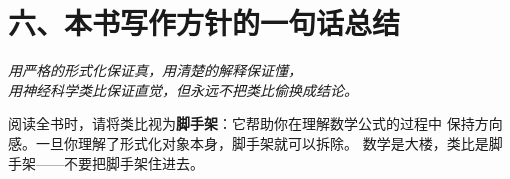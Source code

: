 \section*{六、本书写作方针的一句话总结}

\begin{center}
\large
\textit{用严格的形式化保证真，用清楚的解释保证懂，\\
用神经科学类比保证直觉，但永远不把类比偷换成结论。}
\end{center}

\medskip
\noindent
阅读全书时，请将类比视为\textbf{脚手架}：它帮助你在理解数学公式的过程中
保持方向感。一旦你理解了形式化对象本身，脚手架就可以拆除。
数学是大楼，类比是脚手架——不要把脚手架住进去。
